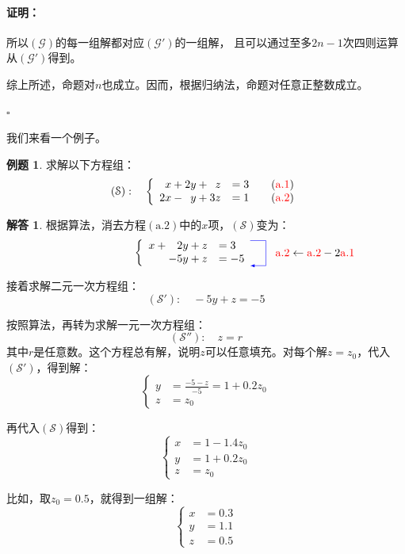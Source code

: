 \documentclass[12pt,UTF8]{ctexbook}
\theoremstyle{definition}
\newtheorem{et}{例题}[section]
\newtheorem*{so}{解答}
\theoremstyle{plain}
\renewenvironment{proof}{\paragraph{\textbf{证明：}}}{\hfill$\square$}
\begin{document}
\begin{proof}
    所以$(\mathcal{G})$的每一组解都对应$(\mathcal{G}')$的一组解，
    且可以通过至多$2n-1$次四则运算从$(\mathcal{G}')$得到。

    综上所述，命题对$n$也成立。因而，根据归纳法，命题对任意正整数成立。

\end{proof}

我们来看一个例子。

\begin{et}
    求解以下方程组：
    $$ (\mathcal{S}):\quad \left\{
        \begin{array}{rl}
    x + 2y + \phantom{0}z &= 3 \quad \quad ({\color{red}\mathrm{a}.1})\\
    2x - \phantom{0}y + 3z &= 1  \quad \quad ({\color{red}\mathrm{a}.2})
    \end{array}
    \right. $$    
\end{et}

\begin{so}
根据算法，消去方程$(\mathrm{a}.2)$中的$x$项，$(\mathcal{S})$变为：
$$ \qquad \qquad \qquad \qquad\qquad \left\{
    \begin{array}{rl}
x + \phantom{-}2y + z &= 3 \\
 - 5y + z &= -5  
\end{array}
\begin{tikzpicture}[baseline={([yshift=-.5ex]current bounding box.center)},>=latex]
    \draw[color=blue, ->] (.5,.4)--(1.0, .4)--(1.0,-.4)--(.5, -.4);
    \node[text width=3.4cm] at (3, 0.0) {${{\color{red}\mathrm{a}.2} \leftarrow {\color{red}\mathrm{a}.2} - 2\color{red}\mathrm{a}.1}$};
  \end{tikzpicture}
\right. $$

接着求解二元一次方程组：
$$ (\mathcal{S}'):\quad  - 5y + z = -5 $$

按照算法，再转为求解一元一次方程组：
$$ (\mathcal{S}''):\quad  z = r $$
其中$r$是任意数。这个方程总有解，说明$z$可以任意填充。对每个解$z = z_0$，代入$(\mathcal{S}')$，得到解：
$$ \left\{
    \begin{array}{rl}
        y &=\frac{-5 - z}{-5} = 1 + 0.2 z_0 \\
        z &= z_0 
    \end{array}
\right. $$

再代入$(\mathcal{S})$得到：
$$ \left\{
    \begin{array}{rl}
        x &= 1 - 1.4 z_0 \\
        y &= 1 + 0.2 z_0\\
        z &= z_0
    \end{array}
\right. $$

比如，取$z_0 = 0.5$，就得到一组解：
$$ \left\{
    \begin{array}{rl}
        x &= 0.3  \\
        y &= 1.1 \\
        z &= 0.5 
    \end{array}
\right. $$
    
\end{so}
\end{document}
